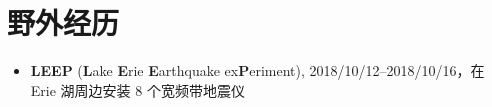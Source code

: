 \section*{野外经历}

\begin{itemize}
\item \textbf{LEEP} (\textbf{L}ake \textbf{E}rie \textbf{E}arthquake ex\textbf{P}eriment),
      2018/10/12--2018/10/16，在 Erie 湖周边安装 8 个宽频带地震仪
\end{itemize}
